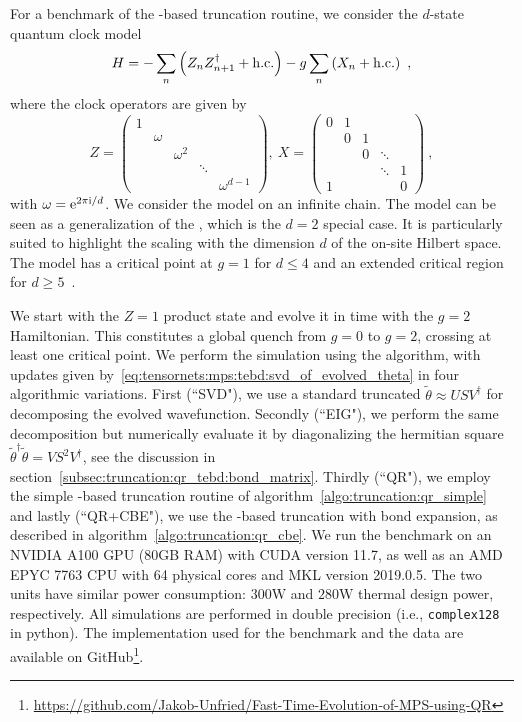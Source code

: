 For a benchmark of the -based truncation routine, we consider the $d$-state quantum clock model
\begin{equation}
    H = -\sum_n \rBr{Z_n Z_{n+1}^\dagger \phc} - g \sum_n \rBr{X_n \phc}
    ~,
\end{equation}
where the clock operators are given by
\begin{equation}
    Z = \begin{pmatrix}
    1 &  & & &
    \\
    & \omega & & &
    \\
    & & \omega^2 & & 
    \\
    & & & \ddots & 
    \\
    & & & & \omega^{d-1}
    \end{pmatrix}
    ,~
    X = \begin{pmatrix}
    0 & 1 & & &
    \\
     & 0 & 1 & &
    \\
    & & 0 & \ddots & 
    \\
    & & & \ddots & 1
    \\
    1 & & & & 0
    \end{pmatrix}
    ~,
\end{equation}
with $\omega = \mathrm{e}^{2\pi\mathrm{i} / d}$.
%
We consider the model on an infinite chain.
%
The model can be seen as a generalization of the , which is the $d=2$ special case.
%
It is particularly suited to highlight the scaling with the dimension $d$ of the on-site Hilbert space.
%
The model has a critical point at $g=1$ for $d \leq 4$ and an extended critical region for $d \geq 5$~\cite{ortiz2012, sun2019}.



We start with the $Z=1$ product state and evolve it in time with the $g=2$ Hamiltonian.
%
This constitutes a global quench from $g=0$ to $g=2$, crossing at least one critical point.
%
We perform the simulation using the  algorithm, with updates given by~\eqref{eq:tensornets:mps:tebd:svd_of_evolved_theta} in four algorithmic variations.
%
First (``SVD"), we use a standard truncated  $\tilde\theta \approx U S V^\dagger$ for decomposing the evolved wavefunction.
%
Secondly (``EIG"), we perform the same decomposition but numerically evaluate it by diagonalizing the hermitian square $\tilde\theta^\dagger \tilde\theta = V S^2 V^\dagger$, see the discussion in section~\ref{subsec:truncation:qr_tebd:bond_matrix}.
%
Thirdly (``QR"), we employ the simple -based truncation routine of algorithm~\ref{algo:truncation:qr_simple} and lastly (``QR+CBE"), we use the -based truncation with bond expansion, as described in algorithm~\ref{algo:truncation:qr_cbe}.
%
We run the benchmark on an NVIDIA A100 GPU (80GB RAM) with CUDA version 11.7, as well as an AMD EPYC 7763 CPU with 64 physical cores and MKL version 2019.0.5.
%
The two units have similar power consumption: $300\mathrm{W}$ and $280\mathrm{W}$ thermal design power, respectively.
%
All simulations are performed in double precision (i.e., \texttt{complex128} in python).
%
The implementation used for the benchmark and the data are available on GitHub\footnote{
    \url{https://github.com/Jakob-Unfried/Fast-Time-Evolution-of-MPS-using-QR}
}.
%


